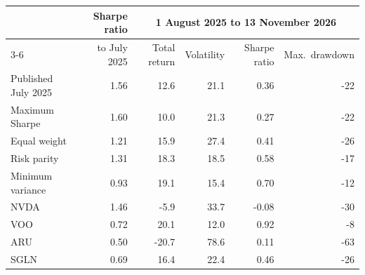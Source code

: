 \begin{tabular}{lrrrrr}
\toprule
 & Sharpe ratio & \multicolumn{4}{c}{1 August 2025 to 13 November 2026} \\
\cmidrule(lr){3-6}
 & to July 2025 & Total return & Volatility & Sharpe ratio & Max.\ drawdown \\
\midrule
Published July 2025 & 1.56 & 12.6 & 21.1 & 0.36 & -22 \\
Maximum Sharpe & 1.60 & 10.0 & 21.3 & 0.27 & -22 \\
Equal weight & 1.21 & 15.9 & 27.4 & 0.41 & -26 \\
Risk parity & 1.31 & 18.3 & 18.5 & 0.58 & -17 \\
Minimum variance & 0.93 & 19.1 & 15.4 & 0.70 & -12 \\
\midrule
NVDA & 1.46 & -5.9 & 33.7 & -0.08 & -30 \\
VOO & 0.72 & 20.1 & 12.0 & 0.92 & -8 \\
ARU & 0.50 & -20.7 & 78.6 & 0.11 & -63 \\
SGLN & 0.69 & 16.4 & 22.4 & 0.46 & -26 \\
\bottomrule
\end{tabular}

